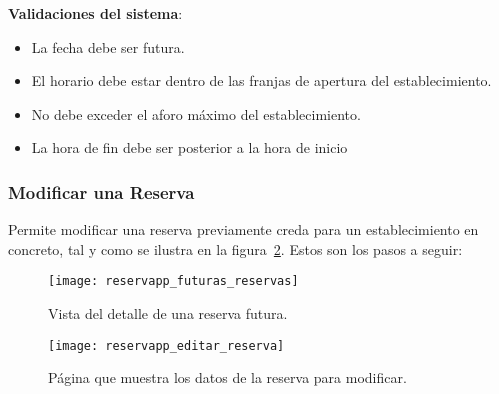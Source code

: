 \textbf{Validaciones del sistema}:
\begin{itemize}
   \item La fecha debe ser futura.
   \item El horario debe estar dentro de las franjas de apertura del establecimiento.
   \item No debe exceder el aforo máximo del establecimiento.
   \item La hora de fin debe ser posterior a la hora de inicio
\end{itemize}

\subsubsection{Modificar una Reserva}
Permite modificar una reserva previamente creda para un establecimiento en concreto, tal y como se ilustra en la figura~\ref{fig:reservapp_editar_reserva}. Estos son los pasos a seguir:

\begin{figure}[H]
	\centering
		\texttt{[image: reservapp\_futuras\_reservas]}
	\caption{Vista del detalle de una reserva futura.}
	\label{fig:reservapp_futuras_reservas}
\end{figure}

\begin{figure}[H]
	\centering
		\texttt{[image: reservapp\_editar\_reserva]}
	\caption{Página que muestra los datos de la reserva para modificar.}
	\label{fig:reservapp_editar_reserva}
\end{figure}

